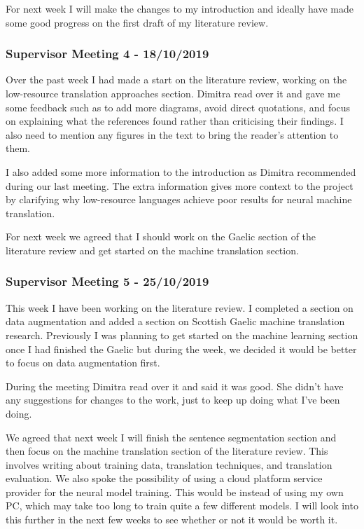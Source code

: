 For next week I will make the changes to my introduction and ideally have made some good progress on the first draft of my literature review. 

\subsubsection{Supervisor Meeting 4 - 18/10/2019}
Over the past week I had made a start on the literature review, working on the low-resource translation approaches section. Dimitra read over it and gave me some feedback such as to add more diagrams, avoid direct quotations, and focus on explaining what the references found rather than criticising their findings. I also need to mention any figures in the text to bring the reader’s attention to them.

I also added some more information to the introduction as Dimitra recommended during our last meeting. The extra information gives more context to the project by clarifying why low-resource languages achieve poor results for neural machine translation. 

For next week we agreed that I should work on the Gaelic section of the literature review and get started on the machine translation section.

\subsubsection{Supervisor Meeting 5 - 25/10/2019}
This week I have been working on the literature review. I completed a section on data augmentation and added a section on Scottish Gaelic machine translation research. Previously I was planning to get started on the machine learning section once I had finished the Gaelic but during the week, we decided it would be better to focus on data augmentation first.

During the meeting Dimitra read over it and said it was good. She didn’t have any suggestions for changes to the work, just to keep up doing what I’ve been doing. 

We agreed that next week I will finish the sentence segmentation section and then focus on the machine translation section of the literature review. This involves writing about training data, translation techniques, and translation evaluation.
We also spoke the possibility of using a cloud platform service provider for the neural model training. This would be instead of using my own PC, which may take too long to train quite a few different models. I will look into this further in the next few weeks to see whether or not it would be worth it.

